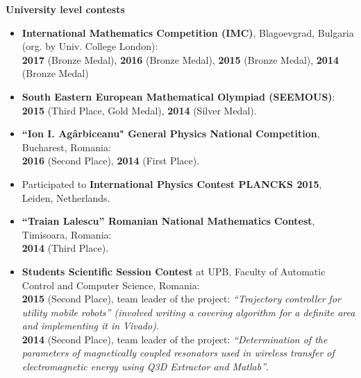 \documentclass[a4paper,10pt]{article}
\newlength{\cvcolumngapwidth}
\newlength{\cvleftcolumnwidth}
\newlength{\cvrightcolumnwidth}
\newcommand{\cvheadingstyle}[1]{{\cvheadingfont\textcolor{cvheadingcolor}{#1}}}
\newlength{\cvafteritemskipamount}
\newlength{\cvparskip}
\newcommand{\cvitem}[2]{
    \begin{minipage}[t]{\cvleftcolumnwidth}
        \raggedleft #1
    \end{minipage}%
    \hspace{\cvcolumngapwidth}%
    \begin{minipage}[t]{\cvrightcolumnwidth}
        \setlength{\parskip}{\cvparskip} #2
    \end{minipage}

    \vspace{\cvafteritemskipamount}
}
\begin{document}
\cvitem{
    \cvheadingstyle{\textbf{University level contests}}
}{
    \begin{itemize}[leftmargin=*]
        \item \textbf{International Mathematics Competition (IMC)}, Blagoevgrad, Bulgaria (org. by Univ. College London): \\
              \textbf{2017} (Bronze Medal), \textbf{2016} (Bronze Medal), \textbf{2015} (Bronze Medal), \textbf{2014} (Bronze Medal)

        \item \textbf{South Eastern European Mathematical Olympiad (SEEMOUS)}: \\
              \textbf{2015} (Third Place, Gold Medal), \textbf{2014} (Silver Medal).

        \item \textbf{``Ion I. Agârbiceanu" General Physics National Competition}, Bucharest, Romania:\\
              \textbf{2016} (Second Place), \textbf{2014} (First Place).

        \item Participated to \textbf{International Physics Contest PLANCKS 2015}, Leiden, Netherlands.

        \item \textbf{``Traian Lalescu'' Romanian National Mathematics Contest}, Timisoara, Romania:\\
              \textbf{2014} (Third Place).

        \item \textbf{Students Scientific Session Contest} at UPB, Faculty of Automatic Control and Computer Science, Romania: \\
              \textbf{2015} (Second Place), team leader of the project: \emph{``Trajectory controller for utility mobile robots'' (involved writing a covering algorithm for a definite area and implementing it in Vivado)}. \\
              \textbf{2014} (Second Place), team leader of the project: \emph{``Determination of the parameters of magnetically coupled resonators used in wireless transfer of electromagnetic energy using Q3D Extractor and Matlab''}.

    \end{itemize}
}
\end{document}
